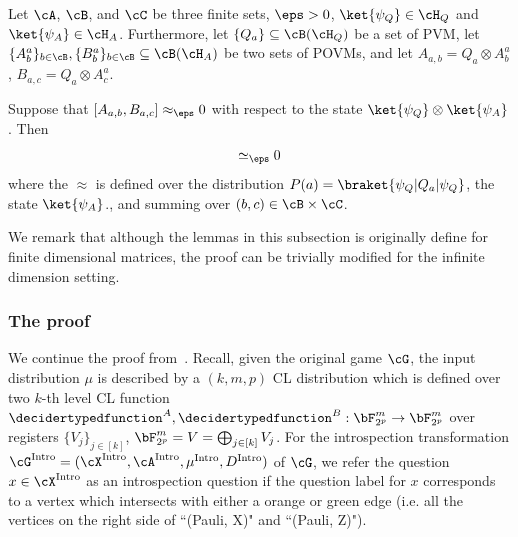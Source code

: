 \begin{lemma} \label{lem:QRsoundnessproofcomm2}
	Let $\cA$, $\cB$, and $\cC$ be three finite sets, $\eps>0$, $\ket{\psi_Q} \in \cH_Q$ and $\ket{\psi_A} \in \cH_A$. Furthermore, let $\{ Q_{a} \} \subseteq \cB(\cH_Q)$ be a set of PVM, let $\{ A^a_b\}_{b \in \cB} ,\{ B^a_b\}_{b \in \cB} \subseteq \cB(\cH_A)$ be two sets of POVMs, and let $A_{a,b} = Q_a \otimes A^a_b$, $B_{a,c} = Q_a \otimes A^a_c$. 
	
	Suppose that $[A_{a,b}, B_{a,c}] \approx_{\eps} 0$ with respect to the state $\ket{\psi_Q} \otimes \ket{\psi_A}$. Then
	\begin{equation*}
		[A^a_b, B^a_c] \simeq_{\eps} 0
	\end{equation*}
	where the $\approx$ is defined over the distribution $P(a) = \braket{\psi_Q| Q_a|\psi_Q}$, the state $\ket{\psi_A}$., and summing over $(b,c) \in \cB \times \cC$. 
\end{lemma} 

We remark that although the lemmas in this subsection is originally define for finite dimensional matrices, the proof can be trivially modified for the infinite dimension setting.

\subsubsection{The proof}

We continue the proof from~. Recall, given the original game $\cG$, the input distribution $\mu$ is described by a $(k,m,p)$ CL distribution which is defined over two $k$-th level CL function $\decidertypedfunction^{A}, \decidertypedfunction^{B}: \bF_{2^p}^m \rightarrow \bF_{2^p}^m$ over registers $\{V_j\}_{j \in [k]}$, $ \bF_{2^p}^m = V = \bigoplus_{j \in [k]} V_j$. For the introspection transformation $\cG^{\text{Intro}} =(\cX^{\text{Intro}}, \cA^{\text{Intro}}, \mu^{\text{Intro}}, D^{\text{Intro}})$ of $\cG$, we refer the question $x \in \cX^{\text{Intro}}$ as an introspection question if the question label for $x$ corresponds to a vertex which intersects with either a orange or green edge (i.e. all the vertices on the right side of ``(Pauli, X)" and ``(Pauli, Z)"). 

